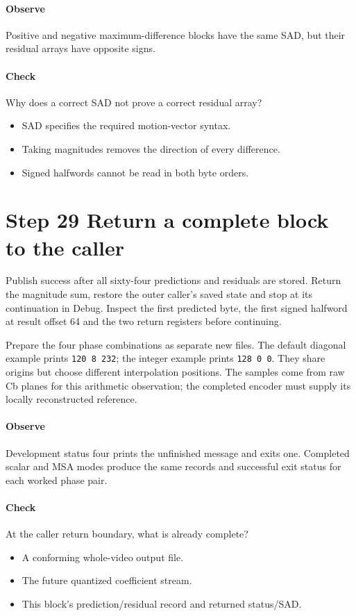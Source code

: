 \paragraph{Observe} Positive and negative maximum-difference blocks have the
same SAD, but their residual arrays have opposite signs.
\paragraph{Check} Why does a correct SAD not prove a correct residual array?
\begin{itemize}
  \item[A.] SAD specifies the required motion-vector syntax.
  \item[B.] Taking magnitudes removes the direction of every difference.
  \item[C.] Signed halfwords cannot be read in both byte orders.
\end{itemize}

\section{Step 29 Return a complete block to the caller}\label{h263-prediction-s09}
Publish success after all sixty-four predictions and residuals are stored.
Return the magnitude sum, restore the outer caller's saved state and stop at its
continuation in Debug. Inspect the first predicted byte, the first signed
halfword at result offset 64 and the two return registers before continuing.

Prepare the four phase combinations as separate new files. The default diagonal
example prints \texttt{120 8 232}; the integer example prints \texttt{128 0 0}.
They share origins but choose different interpolation positions. The samples
come from raw Cb planes for this arithmetic observation; the completed encoder
must supply its locally reconstructed reference.

\paragraph{Observe} Development status four prints the unfinished message and
exits one. Completed scalar and MSA modes produce the same records and successful
exit status for each worked phase pair.
\paragraph{Check} At the caller return boundary, what is already complete?
\begin{itemize}
  \item[A.] A conforming whole-video output file.
  \item[B.] The future quantized coefficient stream.
  \item[C.] This block's prediction/residual record and returned status/SAD.
\end{itemize}

